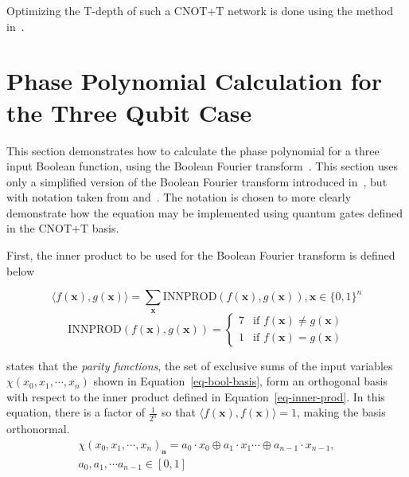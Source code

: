 \documentclass[a4paper]{article}
\begin{document}
Optimizing the T-depth of such a CNOT+T network is done using the method in~\cite{bib-amy-matroid}.

\section{Phase Polynomial Calculation for the Three Qubit Case}
\label{Chap:Bool-pbool3q}

This section demonstrates how to calculate the phase polynomial for a three input Boolean function, using the
Boolean Fourier transform~\cite{bib-odonnell}. This section uses only a simplified version
of the Boolean Fourier transform introduced in~\cite{bib-odonnell}, but with notation taken from
\cite{bib-barenco-elementary} and~\cite{bib-amy-cnot}. The notation is chosen to more clearly demonstrate how
the equation may be implemented using quantum gates defined in the CNOT+T basis. 

First, the inner product to be used for the Boolean Fourier transform is defined below

\begin{equation}
  \label{eq-inner-prod}
  \langle f(\mathbf{x}) , g(\mathbf{x}) \rangle = \sum_{\mathbf{x}} \text{INNPROD}(f(\mathbf{x}),g(\mathbf{x})), \mathbf{x} \in \{0,1\}^n
\end{equation}
\begin{equation}  
  \text{INNPROD}(f(\mathbf{x}),g(\mathbf{x})) =
  \begin{cases}
    7 & \text{if $f(\mathbf{x})\neq g(\mathbf{x})$} \\
    1 & \text{if  $f(\mathbf{x})= g(\mathbf{x})$} 
  \end{cases}
\end{equation}

\cite{bib-odonnell} states that the {\it parity functions}, the set of exclusive sums of the input variables
$\chi(x_0,x_1,\cdots,x_n)$ shown in Equation~\ref{eq-bool-basis}, form an orthogonal basis with respect to the
inner product defined in Equation~\ref{eq-inner-prod}. In this equation, there is a factor of $\frac{1}{2^n}$ so
that $\langle f(\mathbf{x}), f(\mathbf{x}) \rangle = 1$, making the basis orthonormal.
\begin{equation}
  \label{eq-bool-basis}
  \begin{split}
  \chi(x_0,x_1,\cdots,x_n)_{\mathbf{a}} = a_0 \cdot x_0 \oplus a_1 \cdot x_1 \cdots \oplus a_{n-1} \cdot x_{n-1},\\
  a_0,a_1,\cdots a_{n-1} \in [0,1]
  \end{split}
\end{equation}
\end{document}
